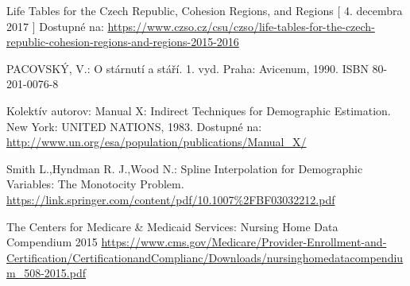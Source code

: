 \documentclass[a4paper, 11pt]{article}
\begin{document}
\begin{thebibliography}{9}
 Life Tables for the Czech Republic, Cohesion Regions, and Regions [ 4. decembra 2017 ] Dostupné na:
\url{https://www.czso.cz/csu/czso/life-tables-for-the-czech-republic-cohesion-regions-and-regions-2015-2016}

 PACOVSKÝ, V.: O stárnutí a stáří. 1. vyd. Praha: Avicenum, 1990. ISBN 80-201-0076-8

 Kolektív autorov: Manual X: Indirect Techniques for Demographic Estimation. New York: UNITED NATIONS, 1983. Dostupné na:
\url{http://www.un.org/esa/population/publications/Manual_X/}

 Smith L.,Hyndman R. J.,Wood N.: Spline Interpolation for Demographic Variables:
The Monotocity Problem. 
\url{https://link.springer.com/content/pdf/10.1007%2FBF03032212.pdf}

 The Centers for Medicare \& Medicaid Services: Nursing Home Data Compendium 2015 
\url{https://www.cms.gov/Medicare/Provider-Enrollment-and-Certification/CertificationandComplianc/Downloads/nursinghomedatacompendium_508-2015.pdf}
\end{thebibliography}
\end{document}
